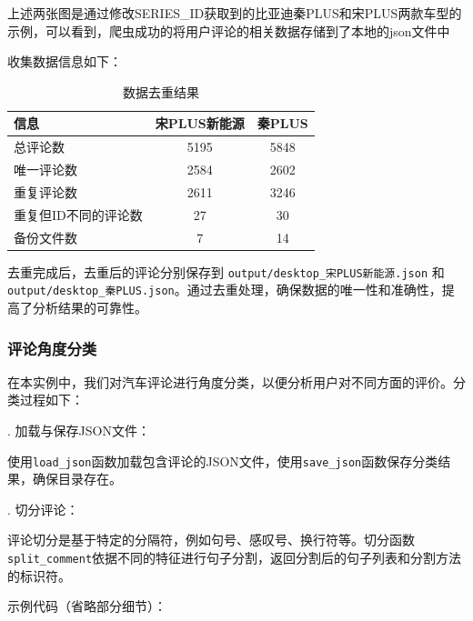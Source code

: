 \documentclass[UTF8,a4paper,15pt,titlepage,oneside]{ctexbook}
\begin{document}
  上述两张图是通过修改SERIES\_ID获取到的比亚迪秦PLUS和宋PLUS两款车型的示例，可以看到，爬虫成功的将用户评论的相关数据存储到了本地的json文件中

  收集数据信息如下：

  \begin{table}[H]
    \centering
    \begin{tabular}{lcc}
    \toprule
    信息 & 宋PLUS新能源 & 秦PLUS \\
    \midrule
    总评论数 & 5195 & 5848 \\
    唯一评论数 & 2584 & 2602 \\
    重复评论数 & 2611 & 3246 \\
    重复但ID不同的评论数 & 27 & 30 \\
    备份文件数 & 7 & 14 \\
    \bottomrule
    \end{tabular}
    \caption{数据去重结果}
\end{table}

去重完成后，去重后的评论分别保存到 \texttt{output/desktop\_宋PLUS新能源.json} 和 \texttt{output/desktop\_秦PLUS.json}。通过去重处理，确保数据的唯一性和准确性，提高了分析结果的可靠性。

\subsubsection{评论角度分类}

在本实例中，我们对汽车评论进行角度分类，以便分析用户对不同方面的评价。分类过程如下：

.	加载与保存JSON文件：

使用\texttt{load\_json}函数加载包含评论的JSON文件，使用\texttt{save\_json}函数保存分类结果，确保目录存在。

.	切分评论：

评论切分是基于特定的分隔符，例如句号、感叹号、换行符等。切分函数\texttt{split\_comment}依据不同的特征进行句子分割，返回分割后的句子列表和分割方法的标识符。

示例代码（省略部分细节）：
\end{document}

